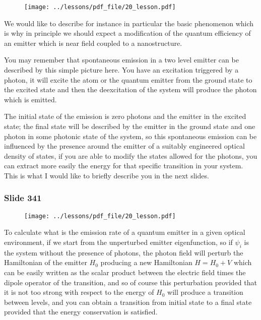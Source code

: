 \documentclass[../main/main.tex]{subfiles}
\begin{document}
\begin{figure}[h!]
\centering
\texttt{[image: ../lessons/pdf\_file/20\_lesson.pdf]}
\end{figure}

We would like to describe for instance in particular the basic phenomenon which is why in principle we should expect a modification of the quantum efficiency of an emitter which is near field coupled to a nanostructure.

You may remember that spontaneous emission in a two level emitter can be described by this simple picture here. You have an excitation triggered by a photon, it will excite the atom or the quantum emitter from the ground state to the excited state and then the deexcitation of the system will produce the photon which is emitted. 

The initial state of the emission is zero photons and the emitter in the excited state; the final state will be described by the emitter in the ground state and one photon in some photonic state of the system, so this spontaneous emission can be influenced by the presence around the emitter of a suitably engineered optical density of states, if you are able to modify the states allowed for the photons, you can extract more easily the energy for that specific transition in your system. This is what I would like to briefly describe you in the next slides.

\newpage

\subsubsection{Slide 341}

\begin{figure}[h!]
\centering
\texttt{[image: ../lessons/pdf\_file/20\_lesson.pdf]}
\end{figure}

To calculate what is the emission rate of a quantum emitter in a given optical environment, if we start from the unperturbed emitter eigenfunction, so if $\psi_i$ is the system without the presence of photons, the photon field will perturb the Hamiltonian of the emitter $H_0$ producing a new Hamiltonian $H=H_0+V$ which can be easily written as the scalar product between the electric field times the dipole operator of the transition, and so of course this perturbation provided that it is not too strong with respect to the energy of $H_0$ will produce a transition between levels, and you can obtain a transition from initial state to a final state provided that the energy conservation is satisfied. 
\end{document}

